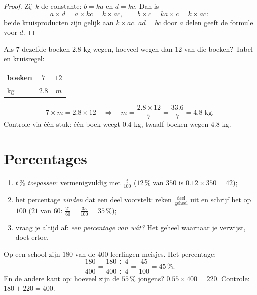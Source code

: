 \begin{proof}
Zij $k$ de constante: $b = ka$ en $d = kc$. Dan is
\[
a \times d = a \times kc = k \times ac,
\qquad
b \times c = ka \times c = k \times ac :
\]
beide kruisproducten zijn gelijk aan $k \times ac$. $ad = bc$ door $a$ delen geeft
de formule voor $d$.
\end{proof}

\begin{example}\label{ex:g7:prop:fourth}
Als $7$ dezelfde boeken $2.8$ kg wegen, hoeveel wegen dan $12$ van die boeken?
Tabel en kruisregel:
\begin{center}
\renewcommand{\arraystretch}{1.3}
\begin{tabular}{l|cc}
boeken & $7$ & $12$ \\
\hline
kg & $2.8$ & $m$ \\
\end{tabular}
\end{center}
\[
7 \times m = 2.8 \times 12
\quad\Longrightarrow\quad
m = \frac{2.8 \times 12}{7} = \frac{33.6}{7} = 4.8 \text{ kg}.
\]
Controle via één stuk: één boek weegt $0.4$ kg, twaalf boeken wegen $4.8$ kg.
\end{example}

\section{Percentages}

\begin{method}\label{met:g7:prop:percent}
\begin{enumerate}
  \item $t\,\%$ \emph{toepassen}: vermenigvuldig met $\frac{t}{100}$ ($12\,\%$
        van $350$ is $0.12 \times 350 = 42$);
  \item het percentage \emph{vinden} dat een deel voorstelt: reken
        $\frac{\text{deel}}{\text{geheel}}$ uit en schrijf het op  $100$
        ($21$ van $60$: $\frac{21}{60} = \frac{35}{100} = 35\,\%$);
  \item vraag je altijd af: \emph{een percentage van wát?} Het geheel waarnaar je
        verwijst, doet ertoe.
\end{enumerate}
\end{method}

\begin{example}\label{ex:g7:prop:percent}
Op een school zijn $180$ van de $400$ leerlingen meisjes. Het percentage:
\[
\frac{180}{400} = \frac{180 \div 4}{400 \div 4} = \frac{45}{100}
= 45\,\% .
\]
En de andere kant op: hoeveel zijn de $55\,\%$ jongens?
$0.55 \times 400 = 220$. Controle: $180 + 220 = 400$.
\end{example}

